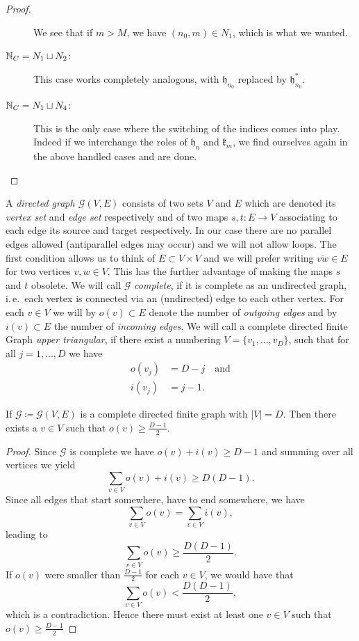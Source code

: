 \begin{proof}
\begin{description}
    We see that if \(m > M\), we have \((n_0, m) \in N_1\), which is what we wanted.
  \item[\(\mathbb{N}_C = N_1 \sqcup N_2\):] This case works completely analogous, with \(\mathfrak{h}_{n_0}\) replaced by \(\mathfrak{h}_{n_0}^\ast\).
  \item[\(\mathbb{N}_C = N_1 \sqcup N_4\):] This is the only case where the switching of the indices comes into play. Indeed if we interchange the roles of \(\mathfrak{h}_n\) and \(\mathfrak{k}_m\), we find ourselves again in the above handled cases and are done.
  \end{description}
\end{proof}

\begin{defin}
  A \emph{directed graph \(\mathcal{G}(V,E)\)} consists of two sets \(V\) and \(E\) which are denoted its \emph{vertex set} and \emph{edge set} respectively and of two maps \(s, t \colon E \to V\) associating to each edge its source and target respectively. In our case there are no parallel edges allowed (antiparallel edges may occur) and we will not allow loops. The first condition allows us to think of \(E \subset V \times V\) and we will prefer writing \(\overline{vw} \in E\) for two vertices \(v,w \in V\). This has the further advantage of making the maps \(s\) and \(t\) obsolete. We will call \(\mathcal{G}\) \emph{complete}, if it is complete as an undirected graph, i.\,e.\ each vertex is connected via an (undirected) edge to each other vertex. For each \(v \in V\) we will by \(o(v) \subset E\) denote the number of \emph{outgoing edges} and by \(i(v) \subset E\) the number of \emph{incoming edges}. We will call a complete directed finite Graph \emph{upper triangular}, if there exist a numbering \(V = \{v_1, \dots, v_D\}\), such that for all \(j = 1, \dots, D\) we have
  \begin{align*}
    o(v_j) & = D - j\quad \text{and}\\
    i(v_j) & = j - 1.
  \end{align*}
\end{defin}

\begin{lemma}[{\cite[Lemma~A.6]{MR3509968}}]
  If \(\mathcal{G} \coloneqq \mathcal{G}(V,E)\) is a complete directed finite graph with \(|V| = D\). Then there exists a \(v \in V\) such that \(o(v) \geq \frac{D-1}{2}\).
\end{lemma}

\begin{proof}
  Since \(\mathcal{G}\) is complete we have \(o(v) + i(v) \geq D - 1\) and summing over all vertices we yield
  \[
    \sum_{v \in V} o(v) + i(v) \geq D(D-1).
  \]
  Since all edges that start somewhere, have to end somewhere, we have
  \[
    \sum_{v \in V} o(v) = \sum_{v \in V} i(v),
  \]
  leading to
  \[
    \sum_{v \in V} o(v) \geq \frac{D(D-1)}{2}.
  \]
  If \(o(v)\) were smaller than \(\frac{D-1}{2}\) for each \(v \in V\), we would have that
  \[
    \sum_{v \in V} o(v) < \frac{D(D-1)}{2},
  \]
  which is a contradiction. Hence there must exist at least one \(v \in V\) such that \(o(v) \geq \frac{D-1}{2}\)
\end{proof}


